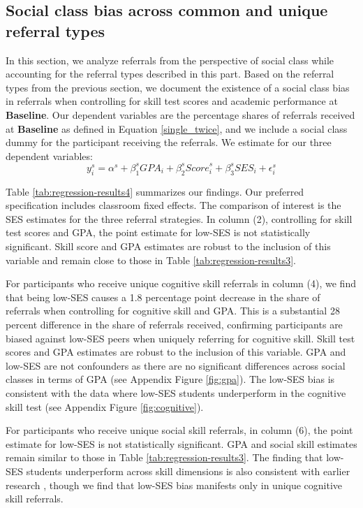 \documentclass[11pt,a4paper,oneside]{article}
\begin{document}
\subsection{Social class bias across common and unique referral types}
In this section, we analyze referrals from the perspective of social class while accounting for the referral types described in this part. Based on the referral types from the previous section, we document the existence of a social class bias in referrals when controlling for skill test scores and academic performance at \textbf{Baseline}. Our dependent variables are the percentage shares of referrals received at \textbf{Baseline} as defined in Equation \ref{single_twice}, and we include a social class dummy for the participant receiving the referrals. We estimate for our three dependent variables:
  \begin{equation}\label{treat-ses}
y_{i}^{s} = \alpha^{s} + \beta_1^{s}{GPA}_{i} + \beta_{2}^{s}{Score}_{i}^{s} + \beta_3^{s}{SES}_{i} + \epsilon_{i}^{s}
\end{equation}
  
Table \ref{tab:regression-results4} summarizes our findings. Our preferred specification includes classroom fixed effects. The comparison of interest is the SES estimates for the three referral strategies. In column (2), controlling for skill test scores and GPA, the point estimate for low-SES is not statistically significant. Skill score and GPA estimates are robust to the inclusion of this variable and remain close to those in Table \ref{tab:regression-results3}.

For participants who receive unique cognitive skill referrals in column (4), we find that being low-SES causes a 1.8 percentage point decrease in the share of referrals when controlling for cognitive skill and GPA. This is a substantial 28 percent difference in the share of referrals received, confirming participants are biased against low-SES peers when uniquely referring for cognitive skill. Skill test scores and GPA estimates are robust to the inclusion of this variable. GPA and low-SES are not confounders as there are no significant differences across social classes in terms of GPA (see Appendix Figure \ref{fig:gpa}). The low-SES bias is consistent with the data where low-SES students underperform in the cognitive skill test (see Appendix Figure \ref{fig:cognitive}).

For participants who receive unique social skill referrals, in column (6), the point estimate for low-SES is not statistically significant. GPA and social skill estimates remain similar to those in Table \ref{tab:regression-results3}. The finding that low-SES students underperform across skill dimensions is also consistent with earlier research \citep{falk2021socioeconomic}, though we find that low-SES bias manifests only in unique cognitive skill referrals.
\end{document}
